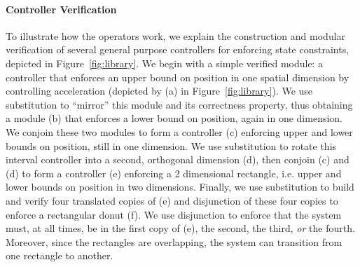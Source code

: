 \paragraph*{Controller Verification}
To illustrate how the operators work, we explain the construction and
modular verification of several general purpose controllers for enforcing
state constraints, depicted in Figure~\ref{fig:library}.  We begin with a
simple verified module: a controller that enforces an upper bound on
position in one spatial dimension by controlling acceleration (depicted by
(a) in Figure~\ref{fig:library}).  We use substitution to ``mirror'' this
module and its correctness property, thus obtaining a module (b) that
enforces a lower bound on position, again in one dimension.  We conjoin
these two modules to form a controller (c) enforcing upper and lower bounds
on position, still in one dimension.  We use substitution to rotate this
interval controller into a second, orthogonal dimension (d), then conjoin
(c) and (d) to form a controller (e) enforcing a 2 dimensional rectangle,
i.e. upper and lower bounds on position in two dimensions.  Finally, we use
substitution to build and verify four translated copies of (e) and
disjunction of these four copies to enforce a rectangular donut (f).  We
use disjunction to enforce that the system must, at all times, be in the
first copy of (e), the second, the third, \emph{or} the fourth.  Moreover,
since the rectangles are overlapping, the system can transition from one
rectangle to another.

